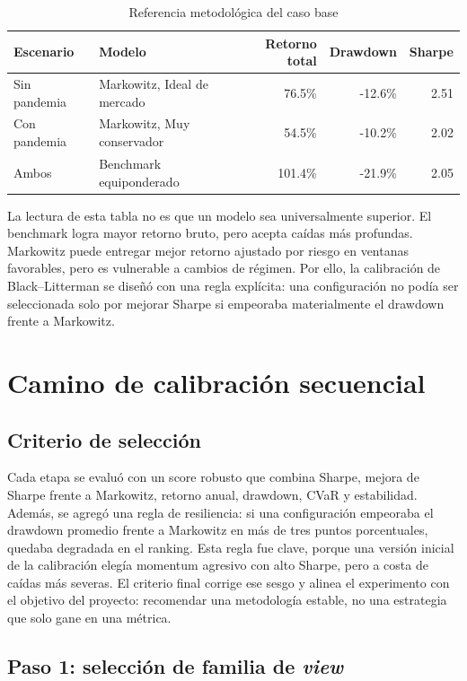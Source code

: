 \documentclass[11pt]{article}
\begin{document}
\begin{table}[H]
\centering
\caption{Referencia metodol\'ogica del caso base}
\label{tab:caso_base}
\begin{tabular}{l l r r r}
\toprule
Escenario & Modelo & Retorno total & Drawdown & Sharpe \\
\midrule
Sin pandemia & Markowitz, Ideal de mercado & 76.5\% & -12.6\% & 2.51 \\
Con pandemia & Markowitz, Muy conservador & 54.5\% & -10.2\% & 2.02 \\
Ambos & Benchmark equiponderado & 101.4\% & -21.9\% & 2.05 \\
\bottomrule
\end{tabular}
\end{table}

La lectura de esta tabla no es que un modelo sea universalmente superior. El benchmark logra mayor retorno bruto, pero acepta ca\'idas m\'as profundas. Markowitz puede entregar mejor retorno ajustado por riesgo en ventanas favorables, pero es vulnerable a cambios de r\'egimen. Por ello, la calibraci\'on de Black--Litterman se dise\~n\'o con una regla expl\'icita: una configuraci\'on no pod\'ia ser seleccionada solo por mejorar Sharpe si empeoraba materialmente el drawdown frente a Markowitz.

\section{Camino de calibraci\'on secuencial}

\subsection{Criterio de selecci\'on}

Cada etapa se evalu\'o con un score robusto que combina Sharpe, mejora de Sharpe frente a Markowitz, retorno anual, drawdown, CVaR y estabilidad. Adem\'as, se agreg\'o una regla de resiliencia: si una configuraci\'on empeoraba el drawdown promedio frente a Markowitz en m\'as de tres puntos porcentuales, quedaba degradada en el ranking. Esta regla fue clave, porque una versi\'on inicial de la calibraci\'on eleg\'ia momentum agresivo con alto Sharpe, pero a costa de ca\'idas m\'as severas. El criterio final corrige ese sesgo y alinea el experimento con el objetivo del proyecto: recomendar una metodolog\'ia estable, no una estrategia que solo gane en una m\'etrica.

\subsection{Paso 1: selecci\'on de familia de \textit{view}}
\end{document}
